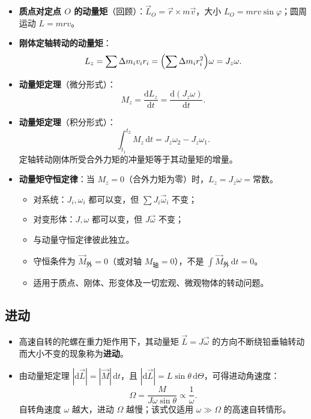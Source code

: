 \documentclass[12pt,a4paper]{ctexart}
\begin{document}
\begin{itemize}
    \item \textbf{质点对定点 $O$ 的动量矩}（回顾）：$\vec{L}_O = \vec{r}\times m\vec{v}$，大小 $L_O = mrv\sin\varphi$；圆周运动 $L = mrv$。
    \item \textbf{刚体定轴转动的动量矩}：
    \[
        L_z = \sum \Delta m_i v_i r_i = \Bigl(\sum \Delta m_i r_i^2\Bigr)\omega = J_z\omega.
    \]
    \item \textbf{动量矩定理}（微分形式）：
    \[
        M_z = \frac{\mathrm{d}L_z}{\mathrm{d}t} = \frac{\mathrm{d}(J_z\omega)}{\mathrm{d}t}.
    \]
    \item \textbf{动量矩定理}（积分形式）：
    \[
        \int_{t_1}^{t_2} M_z\,\mathrm{d}t = J_z\omega_2 - J_z\omega_1.
    \]
    定轴转动刚体所受合外力矩的冲量矩等于其动量矩的增量。
    \item \textbf{动量矩守恒定律}：当 $M_z = 0$（合外力矩为零）时，$L_z = J_z\omega = \text{常数}$。
    \begin{itemize}
        \item 对系统：$J_i,\omega_i$ 都可以变，但 $\sum J_i\vec{\omega}_i$ 不变；
        \item 对变形体：$J,\omega$ 都可以变，但 $J\vec{\omega}$ 不变；
        \item 与动量守恒定律彼此独立。
        \item 守恒条件为 $\vec{M}_{\text{外}}=0$（或对轴 $M_{\text{轴}}=0$），不是 $\int\vec{M}_{\text{外}}\,\mathrm{d}t=0$。
        \item 适用于质点、刚体、形变体及一切宏观、微观物体的转动问题。
    \end{itemize}
\end{itemize}

\subsection{进动}

\begin{itemize}
    \item 高速自转的陀螺在重力矩作用下，其动量矩 $\vec{L}=J\vec{\omega}$ 的方向不断绕铅垂轴转动而大小不变的现象称为\textbf{进动}。
    \item 由动量矩定理 $|\mathrm{d}\vec{L}| = |\vec{M}|\,\mathrm{d}t$，且 $|\mathrm{d}\vec{L}| = L\sin\theta\,\mathrm{d}\Theta$，可得进动角速度：
    \[
        \Omega = \frac{M}{J\omega\sin\theta} \propto \frac{1}{\omega}.
    \]
    自转角速度 $\omega$ 越大，进动 $\Omega$ 越慢；该式仅适用 $\omega \gg \Omega$ 的高速自转情形。
\end{itemize}
\end{document}
